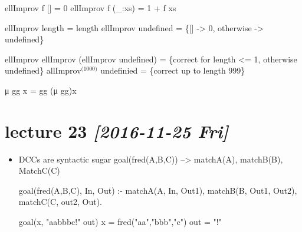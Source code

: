\documentclass[11pt]{article}
\begin{document}
ellImprov f [] = 0
ellImprov f (\_:xs) = 1 + f xs

ellImprov length = length
ellImprov undefined = \{[] -> 0, otherwise -> undefined\}

ellImprov ellImprov (ellImprov undefined) = \{correct for length <= 1, otherwise undefined\}
allImprov$^{\text{(1000)}}$ undefinied = \{correct up to length 999\}

μ gg x = gg (μ gg)x

\section{lecture 23 \textit{[2016-11-25 Fri]}}
\label{sec-21}
\begin{itemize}
\item DCCs are syntactic sugar
goal(fred(A,B,C))
          -->
           matchA(A), matchB(B), MatchC(C)

goal(fred(A,B,C), In, Out) :-
  matchA(A, In, Out1),
  matchB(B, Out1, Out2),
  matchC(C, out2, Out).

goal(x, "aabbbc!" out)
x = fred("aa","bbb","c")
out = "!"
\end{itemize}
\end{document}
